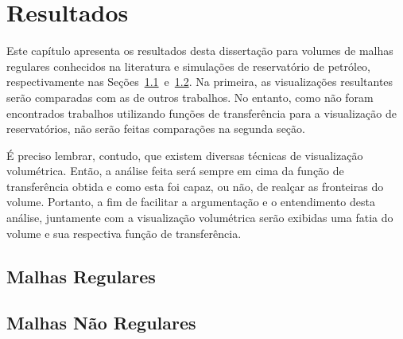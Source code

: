 
\chapter{Resultados}
\label{ch:result}

	Este capítulo apresenta os resultados desta dissertação para volumes de malhas regulares conhecidos na literatura e simulações de reservatório de petróleo, respectivamente nas Seções~\ref{sec:result.reg}~e~\ref{sec:result.irreg}. Na primeira, as visualizações resultantes serão comparadas com as de outros trabalhos. No entanto, como não foram encontrados trabalhos utilizando funções de transferência para a visualização de reservatórios, não serão feitas comparações na segunda seção.
	
	É preciso lembrar, contudo, que existem diversas técnicas de visualização volumétrica. Então, a análise feita será sempre em cima da função de transferência obtida e como esta foi capaz, ou não, de realçar as fronteiras do volume. Portanto, a fim de facilitar a argumentação e o entendimento desta análise, juntamente com a visualização volumétrica serão exibidas uma fatia do volume e sua respectiva função de transferência.
	
\section{Malhas Regulares}
\label{sec:result.reg}

\section{Malhas Não Regulares}
\label{sec:result.irreg}